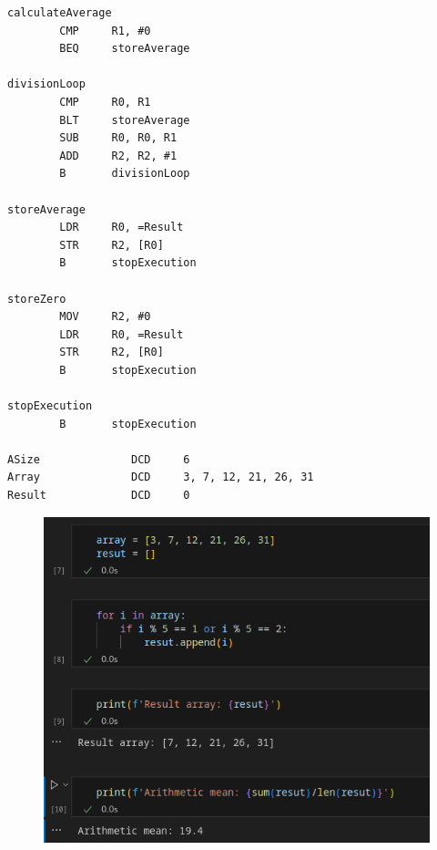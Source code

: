 \documentclass[a4paper,12pt]{article}
\begin{document}
\newpage
    \begin{lstlisting}[language=assembler]
calculateAverage   
        CMP     R1, #0
        BEQ     storeAverage

divisionLoop       
        CMP     R0, R1
        BLT     storeAverage
        SUB     R0, R0, R1
        ADD     R2, R2, #1
        B       divisionLoop

storeAverage       
        LDR     R0, =Result
        STR     R2, [R0]
        B       stopExecution

storeZero          
        MOV     R2, #0
        LDR     R0, =Result
        STR     R2, [R0]
        B       stopExecution

stopExecution      
        B       stopExecution 

ASize              DCD     6
Array              DCD     3, 7, 12, 21, 26, 31
Result             DCD     0

    \end{lstlisting}
    \begin{figure}[h!]
        \begin{minipage}[h]{1\linewidth}
            \centering
            \includegraphics[width=0.6\linewidth]{Prt sc/python_code_1.png}  
        \end{minipage}
    \end{figure}
\end{document}
